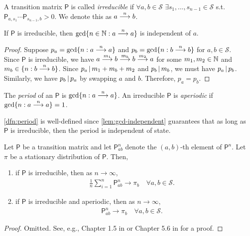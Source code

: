 \documentclass[a4paper]{article}
\begin{document}
\begin{definition}[Irreducible]
	A transition matrix $\mathsf{P}$ is called \emph{irreducible}
	if $\forall a,b\in\mathcal{S}$ $\exists s_1,...,s_{n-1}\in\mathcal{S}$ s.t.\ $\mathsf{P}_{a,s_1}\cdots\mathsf{P}_{s_{n-1},b}>0$.
	We denote this as $a\nto b$.
\end{definition}

\begin{lemma}\label{lem:gcd-independent}
	If $\mathsf{P}$ is irreducible, then $\gcd\{n\in\naturals:a\nto a\}$ is independent of $a$.
\end{lemma}
\begin{proof}
	Suppose $p_a=\gcd\{n:a\nto a\}$ and $p_b=\gcd\{n:b\nto b\}$ for $a,b\in\mathcal{S}$.
	Since $\mathsf{P}$ is irreducible,
	we have $a\nto[m_1]b\nto[m_b]b\nto[m_2]a$ for some $m_1,m_2\in\naturals$ and $m_b\in\{n:b\nto b\}$.
	Since $p_a\divides m_1+m_b+m_2$ and $p_b\divides m_b$, we must have $p_a\divides p_b$.
	Similarly, we have $p_b\divides p_a$ by swapping $a$ and $b$.
	Therefore, $p_a=p_b$.
\end{proof}

\begin{definition}[Period]\label{dfn:period}
	The \emph{period} of an $\mathsf{P}$ is $\gcd\{n:a\nto a\}$.
	An irreducible $\mathsf{P}$ is \emph{aperiodic} if $\gcd\{n:a\nto a\}=1$.
\end{definition}

\begin{remark}
	\autoref{dfn:period} is well-defined since
	\autoref{lem:gcd-independent} guarantees that as long as $\mathsf{P}$ is irreducible,
	then the period is independent of state.
\end{remark}

\begin{theorem}\label{thm:ergodicity-for-markov-chains}
	Let $\mathsf{P}$ be a transition matrix and let $\mathsf{P}_{ab}^{n}$ denote the $(a,b)$-th element of $\mathsf{P}^n$.
	Let $\pi$ be a stationary distribution of $\mathsf{P}$.
	Then,
	\begin{enumerate}
		\item
			if $\mathsf{P}$ is irreducible, then as $n\to\infty$,
			\begin{align*}
				\frac1n \sum_{i=1}^{n} \mathsf{P}_{ab}^{n} \to \pi_{b} \quad\forall a,b\in\mathcal{S}.
			\end{align*}
		\item
			if $\mathsf{P}$ is irreducible and aperiodic, then as $n\to\infty$,
			\begin{align*}
				\mathsf{P}_{ab}^{n} \to \pi_{b} \quad\forall a,b\in\mathcal{S}.
			\end{align*}
	\end{enumerate}
\end{theorem}
\begin{proof}
	Omitted.
	See, e.g., Chapter 1.5 in \cite{sarig-2023} or Chapter 5.6 in \cite{durett-2019} for a proof.
\end{proof}
\end{document}
